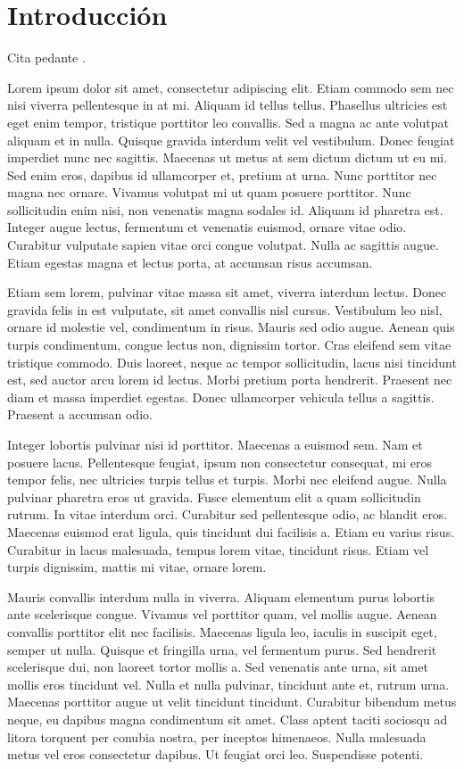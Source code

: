 \chapter{Introducción}

Cita pedante \cite{google01}.

Lorem ipsum dolor sit amet, consectetur adipiscing elit. Etiam commodo sem nec 
nisi viverra pellentesque in at mi. Aliquam id tellus tellus. Phasellus 
ultricies est eget enim tempor, tristique porttitor leo convallis. Sed a magna 
ac ante volutpat aliquam et in nulla. Quisque gravida interdum velit vel 
vestibulum. Donec feugiat imperdiet nunc nec sagittis. Maecenas ut metus at sem 
dictum dictum ut eu mi. Sed enim eros, dapibus id ullamcorper et, pretium at 
urna. Nunc porttitor nec magna nec ornare. Vivamus volutpat mi ut quam posuere 
porttitor. Nunc sollicitudin enim nisi, non venenatis magna sodales id. Aliquam 
id pharetra est. Integer augue lectus, fermentum et venenatis euismod, ornare 
vitae odio. Curabitur vulputate sapien vitae orci congue volutpat. Nulla ac 
sagittis augue. Etiam egestas magna et lectus porta, at accumsan risus accumsan.

Etiam sem lorem, pulvinar vitae massa sit amet, viverra interdum lectus. Donec 
gravida felis in est vulputate, sit amet convallis nisl cursus. Vestibulum leo 
nisl, ornare id molestie vel, condimentum in risus. Mauris sed odio augue. 
Aenean quis turpis condimentum, congue lectus non, dignissim tortor. Cras 
eleifend sem vitae tristique commodo. Duis laoreet, neque ac tempor 
sollicitudin, lacus nisi tincidunt est, sed auctor arcu lorem id lectus. Morbi 
pretium porta hendrerit. Praesent nec diam et massa imperdiet egestas. Donec 
ullamcorper vehicula tellus a sagittis. Praesent a accumsan odio.

Integer lobortis pulvinar nisi id porttitor. Maecenas a euismod sem. Nam et 
posuere lacus. Pellentesque feugiat, ipsum non consectetur consequat, mi eros 
tempor felis, nec ultricies turpis tellus et turpis. Morbi nec eleifend augue. 
Nulla pulvinar pharetra eros ut gravida. Fusce elementum elit a quam 
sollicitudin rutrum. In vitae interdum orci. Curabitur sed pellentesque odio, ac 
blandit eros. Maecenas euismod erat ligula, quis tincidunt dui facilisis a. 
Etiam eu varius risus. Curabitur in lacus malesuada, tempus lorem vitae, 
tincidunt risus. Etiam vel turpis dignissim, mattis mi vitae, ornare lorem.

Mauris convallis interdum nulla in viverra. Aliquam elementum purus lobortis 
ante scelerisque congue. Vivamus vel porttitor quam, vel mollis augue. Aenean 
convallis porttitor elit nec facilisis. Maecenas ligula leo, iaculis in suscipit 
eget, semper ut nulla. Quisque et fringilla urna, vel fermentum purus. Sed 
hendrerit scelerisque dui, non laoreet tortor mollis a. Sed venenatis ante urna, 
sit amet mollis eros tincidunt vel. Nulla et nulla pulvinar, tincidunt ante et, 
rutrum urna. Maecenas porttitor augue ut velit tincidunt tincidunt. Curabitur 
bibendum metus neque, eu dapibus magna condimentum sit amet. Class aptent taciti 
sociosqu ad litora torquent per conubia nostra, per inceptos himenaeos. Nulla 
malesuada metus vel eros consectetur dapibus. Ut feugiat orci leo. Suspendisse 
potenti.

